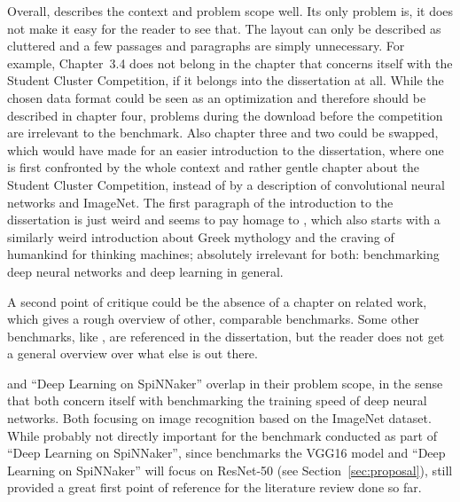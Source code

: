 \documentclass{article}
\begin{document}
Overall, \citet{nita_2018} describes the context and
problem scope well.
Its only problem is, it does not make it easy for the
reader to see that.
The layout can only be described as cluttered and a few
passages and paragraphs are simply unnecessary.
For example, Chapter~3.4 does not belong in the chapter
that concerns itself with the Student Cluster Competition,
if it belongs into the dissertation at all.
While the chosen data format could be seen as an
optimization and therefore should be described in chapter
four, problems during the download before the competition
are irrelevant to the benchmark.
Also chapter three and two could be swapped, which would
have made for an easier introduction to the dissertation,
where one is first confronted by the whole context and
rather gentle chapter about the Student Cluster
Competition, instead of by a description of convolutional
neural networks and ImageNet.
The first paragraph of the introduction to the dissertation
is just weird and seems to pay homage to
\citet{goodfellow2016}, which also starts with a similarly
weird introduction about Greek mythology and the craving of
humankind for thinking machines; absolutely irrelevant for
both: benchmarking deep neural networks and deep learning
in general.

A second point of critique could be the absence of a
chapter on related work, which gives a rough overview of
other, comparable benchmarks.
Some other benchmarks, like \citet{you2017}, are referenced
in the dissertation, but the reader does not get a general
overview over what else is out there.

\citet{nita_2018} and ``Deep Learning on SpiNNaker''
overlap in their problem scope, in the sense that both
concern itself with benchmarking the training speed of
deep neural networks.
Both focusing on image recognition based on the ImageNet
dataset.
While probably not directly important for the benchmark
conducted as part of ``Deep Learning on SpiNNaker'',
since \citet{nita_2018} benchmarks the VGG16 model and
``Deep Learning on SpiNNaker'' will focus on ResNet-50
(see Section~\ref{sec:proposal}),
\citet{nita_2018} still provided a great first point of
reference for the literature review done so far.



\end{document}
